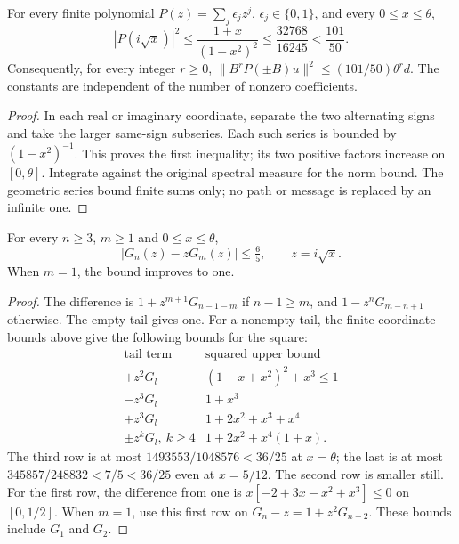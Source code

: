 \begin{lemma}\label{lem:odd-common:mask}
For every finite polynomial \(P(z)=\sum_j\epsilon_jz^j\),
\(\epsilon_j\in\{0,1\}\), and every \(0\le x\le\theta\),
\begin{equation}\label{eq:odd-common:mask}
 |P(i\sqrt x)|^2\le\frac{1+x}{(1-x^2)^2}
 \le\frac{32768}{16245}<\frac{101}{50}.
\end{equation}
Consequently, for every integer \(r\ge0\),
\(\|B^rP(\pm B)u\|^2\le(101/50)\theta^r d\).
The constants are independent of the number of nonzero coefficients.
\end{lemma}
\begin{proof}
In each real or imaginary coordinate, separate the two alternating
signs and take the larger same-sign subseries. Each such series is
bounded by \((1-x^2)^{-1}\). This proves the first inequality;
its two positive factors increase on \([0,\theta]\).
Integrate against the original spectral measure for the norm bound.
The geometric series bound finite sums only; no path or message is
replaced by an infinite one.
\end{proof}

\begin{lemma}\label{lem:odd-common:joint-paths}
For every \(n\ge3\), \(m\ge1\) and \(0\le x\le\theta\),
\begin{equation}\label{eq:odd-common:joint-paths}
 |G_n(z)-zG_m(z)|\le\tfrac65,\qquad z=i\sqrt x.
\end{equation}
When \(m=1\), the bound improves to one.
\end{lemma}
\begin{proof}
The difference is \(1+z^{m+1}G_{n-1-m}\) if \(n-1\ge m\), and
\(1-z^nG_{m-n+1}\) otherwise. The empty tail gives one.
For a nonempty tail, the finite coordinate bounds above give the
following bounds for the square:
\[
\begin{array}{c|c}
 \text{tail term}&\text{squared upper bound}\\ \hline
 +z^2G_l&(1-x+x^2)^2+x^3\le1\\
 -z^3G_l&1+x^3\\
 +z^3G_l&1+2x^2+x^3+x^4\\
 \pm z^kG_l,\ k\ge4&1+2x^2+x^4(1+x).
\end{array}
\]
The third row is at most \(1493553/1048576<36/25\) at
\(x=\theta\); the last is at most
\(345857/248832<7/5<36/25\) even at \(x=5/12\).
The second row is smaller still. For the first row,
the difference from one is
\(x[-2+3x-x^2+x^3]\le0\) on \([0,1/2]\).
When \(m=1\), use this first row on
\(G_n-z=1+z^2G_{n-2}\). These bounds include \(G_1\) and \(G_2\).
\end{proof}

